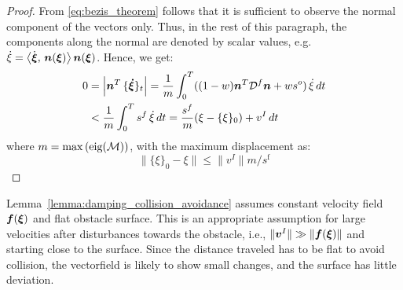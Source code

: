 \begin{proof}
From \eqref{eq:bezis_theorem} follows that it is sufficient to observe the normal component of the vectors only. Thus, in the rest of this paragraph, the components along the normal are denoted by scalar values, e.g. $\dot \xi = \left\langle {\dot{\boldsymbol{\xi}}}, \, {\boldsymbol{n}(\boldsymbol{\xi})} \right\rangle \boldsymbol{n}(\boldsymbol{\xi})$.
Hence, we get:
\begin{align}
	0 & = \left| \boldsymbol{n}^T \, \{ \boldsymbol{\dot \xi} \}_{t} \right| 
	  = \frac 1 m \int_0^T ( (1-w) \boldsymbol{n}^T \mathcal{D}^f \boldsymbol{n} + w s^{o} ) \, {\dot \xi} \, dt \nonumber \\
	   & < \frac 1 m \int_0^T  s^{f}  \, {\dot \xi} \, dt 
	   = \frac{s^f}{m} (\xi - \{ \xi \}_0 ) + v^I \, dt 
\end{align}
where $m = \max{\left(\text{eig}(\mathcal{M})\right)}$, with the maximum displacement as:
\begin{equation}
	\| \{\xi \}_0 - {\xi} \| \leq \| v^I \| {m} / {s^{\mathrm{f}}} 
\end{equation}
\end{proof}
\else
{}
\fi
Lemma~\ref{lemma:damping_collision_avoidance} assumes constant velocity field $\boldsymbol{f}(\boldsymbol{\xi})$ and flat obstacle surface. This is an appropriate assumption for large velocities after disturbances towards the obstacle, i.e., $\| \boldsymbol{v}^I \| \gg \| \boldsymbol{f}(\boldsymbol{\xi}) \|$ and starting close to the surface. Since the distance traveled has to be flat to avoid collision, the vectorfield is likely to show small changes, and the surface has little deviation. 

